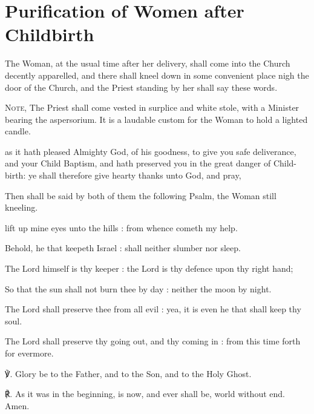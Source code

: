 \section{Purification of Women after Childbirth}
\fancyhead[RE,LO]{}

\begin{rubric}
	The Woman, at the usual time after her delivery, shall come into the Church decently apparelled, and there shall kneel down in some convenient place nigh the door of the Church, and the Priest standing by her shall say these words.\par
	\textsc{Note,} The Priest shall come vested in surplice and white stole, with a Minister bearing the aspersorium. It is a laudable custom for the Woman to hold a lighted candle.
\end{rubric}

 as it hath pleased Almighty God, of his goodness, to give you safe deliverance, and your Child Baptism, and hath preserved you in the great danger of Child-birth: ye shall therefore give hearty thanks unto God, and pray,
\begin{rubric}
	Then shall be said by both of them the following Psalm, the Woman still kneeling.
\end{rubric}

 lift up mine eyes unto the hills : from whence cometh my help.\par
{}
Behold, he that keepeth Israel : shall neither slumber nor sleep.\par
{}The Lord himself is thy keeper : the Lord is thy defence upon thy right hand;\par
{}So that the sun shall not burn thee by day : neither the moon by night.\par
{}The Lord shall preserve thee from all evil : yea, it is even he that shall keep thy soul.\par
{}The Lord shall preserve thy going out, and thy coming in : from this time forth for evermore.\par
℣. Glory be to the Father, and to the Son, and to the Holy Ghost.\par
℟. As it was in the beginning, is now, and ever shall be, world without end. Amen.\\

